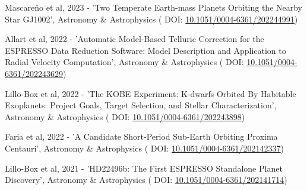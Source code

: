 \vspace*{0.3cm}

  Mascare{\~n}o et al, 2023 - 'Two Temperate {{Earth-mass}} Planets Orbiting the Nearby Star {{GJ1002}}', Astronomy \& Astrophysics ( \textcolor{MarkerColour!80!black}{\scriptsize\faLink} DOI: \href{http://dx.doi.org/10.1051/0004-6361/202244991}{10.1051/0004-6361/202244991})

\vspace*{0.3cm}

  Allart et al, 2022 - 'Automatic Model-Based Telluric Correction for the {{ESPRESSO}} Data Reduction Software: {{Model}} Description and Application to Radial Velocity Computation', Astronomy \& Astrophysics ( \textcolor{MarkerColour!80!black}{\scriptsize\faLink} DOI: \href{http://dx.doi.org/10.1051/0004-6361/202243629}{10.1051/0004-6361/202243629})

\vspace*{0.3cm}

  {Lillo-Box} et al, 2022 - 'The {{KOBE}} Experiment: {{K-dwarfs Orbited By}} Habitable {{Exoplanets}}: {{Project}} Goals, Target Selection, and Stellar Characterization', Astronomy \& Astrophysics ( \textcolor{MarkerColour!80!black}{\scriptsize\faLink} DOI: \href{http://dx.doi.org/10.1051/0004-6361/202243898}{10.1051/0004-6361/202243898})

\vspace*{0.3cm}

  Faria et al, 2022 - 'A Candidate Short-Period Sub-{{Earth}} Orbiting {{Proxima Centauri}}', Astronomy \& Astrophysics ( \textcolor{MarkerColour!80!black}{\scriptsize\faLink} DOI: \href{http://dx.doi.org/10.1051/0004-6361/202142337}{10.1051/0004-6361/202142337})

\vspace*{0.3cm}

  {Lillo-Box} et al, 2021 - '{{HD22496b}}: The First {{ESPRESSO}} Standalone Planet Discovery', Astronomy \& Astrophysics ( \textcolor{MarkerColour!80!black}{\scriptsize\faLink} DOI: \href{http://dx.doi.org/10.1051/0004-6361/202141714}{10.1051/0004-6361/202141714})

\vspace*{0.3cm}

\vspace*{0.2cm}


\vspace*{0.2cm}

